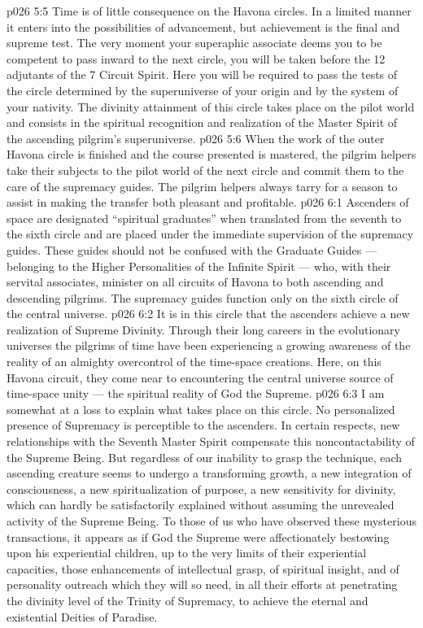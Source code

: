 \vs p026 5:5 Time is of little consequence on the Havona circles. In a limited manner it enters into the possibilities of advancement, but achievement is the final and supreme test. The very moment your superaphic associate deems you to be competent to pass inward to the next circle, you will be taken before the 12 adjutants of the 7 Circuit Spirit. Here you will be required to pass the tests of the circle determined by the superuniverse of your origin and by the system of your nativity. The divinity attainment of this circle takes place on the pilot world and consists in the spiritual recognition and realization of the Master Spirit of the ascending pilgrim’s superuniverse.
\vs p026 5:6 When the work of the outer Havona circle is finished and the course presented is mastered, the pilgrim helpers take their subjects to the pilot world of the next circle and commit them to the care of the supremacy guides. The pilgrim helpers always tarry for a season to assist in making the transfer both pleasant and profitable.
\vs p026 6:1 Ascenders of space are designated “spiritual graduates” when translated from the seventh to the sixth circle and are placed under the immediate supervision of the supremacy guides. These guides should not be confused with the Graduate Guides --- belonging to the Higher Personalities of the Infinite Spirit --- who, with their servital associates, minister on all circuits of Havona to both ascending and descending pilgrims. The supremacy guides function only on the sixth circle of the central universe.
\vs p026 6:2 It is in this circle that the ascenders achieve a new realization of Supreme Divinity. Through their long careers in the evolutionary universes the pilgrims of time have been experiencing a growing awareness of the reality of an almighty overcontrol of the time\hyp{}space creations. Here, on this Havona circuit, they come near to encountering the central universe source of time\hyp{}space unity --- the spiritual reality of God the Supreme.
\vs p026 6:3 I am somewhat at a loss to explain what takes place on this circle. No personalized presence of Supremacy is perceptible to the ascenders. In certain respects, new relationships with the Seventh Master Spirit compensate this noncontactability of the Supreme Being. But regardless of our inability to grasp the technique, each ascending creature seems to undergo a transforming growth, a new integration of consciousness, a new spiritualization of purpose, a new sensitivity for divinity, which can hardly be satisfactorily explained without assuming the unrevealed activity of the Supreme Being. To those of us who have observed these mysterious transactions, it appears as if God the Supreme were affectionately bestowing upon his experiential children, up to the very limits of their experiential capacities, those enhancements of intellectual grasp, of spiritual insight, and of personality outreach which they will so need, in all their efforts at penetrating the divinity level of the Trinity of Supremacy, to achieve the eternal and existential Deities of Paradise.
